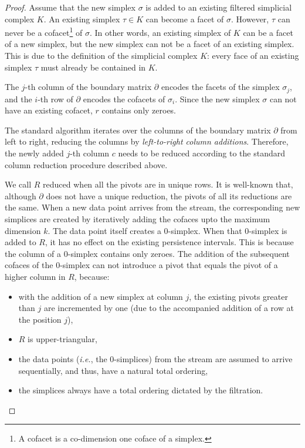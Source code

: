 \documentclass[11pt]{article}
\begin{document}
\begin{proof}
	Assume that the new simplex $\sigma$ is added to an existing filtered simplicial complex $K$.  
	An existing simplex $\tau \in K$ can become a facet of $\sigma$.  However, $\tau$ can never be 
	a cofacet\footnote{A cofacet is a co-dimension one coface of a simplex.} of $\sigma$.  In other 
	words, an existing simplex of $K$ can be a facet of a new simplex, but the new simplex can not 
	be a facet of an existing simplex.  This is due to the definition of the simplicial complex 
	$K$: every face of an existing simplex $\tau$ must already be contained in $K$.
	
	The $j$-th column of the boundary matrix $\partial$ encodes the facets of the simplex 
	$\sigma_j$, and the $i$-th row of $\partial$ encodes the cofacets of $\sigma_i$.  Since the new 
	simplex $\sigma$ can not have an existing cofacet, $r$ contains only zeroes.
	
	
	The standard algorithm iterates over the columns of the boundary matrix $\partial$ from left to 
	right, reducing the columns by \emph{left-to-right column additions}.  Therefore, the newly 
	added $j$-th column $c$ needs to be reduced according to the standard column reduction 
	procedure described above.
	
	
	We call $R$ reduced when all the pivots are in unique rows.  It is well-known that, although 
	$\partial$ does not have a unique reduction, the pivots of all its reductions are the same.  
	When a new data point arrives from the stream, the corresponding new simplices are created by 
	iteratively adding the cofaces upto the maximum dimension $k$.  The data point itself creates a 
	0-simplex.  When that 0-simplex is added to $R$, it has no effect on the existing persistence 
	intervals.  This is because the column of a 0-simplex contains only zeroes.  The addition of 
	the subsequent cofaces of the 0-simplex can not introduce a pivot that equals the pivot of a 
	higher column in $R$, because:
	
	
	\begin{itemize}
		\item with the addition of a new simplex at column $j$, the existing pivots greater than 
		$j$ are incremented by one (due to the accompanied addition of a row at the position $j$),
		\item $R$ is upper-triangular,
		\item the data points (\textit{i.e.}, the 0-simplices) from the stream are assumed to 
		arrive sequentially, and thus, have a natural total ordering,
		\item the simplices always have a total ordering dictated by the filtration.
	\end{itemize}
	
\end{proof}




\end{document}
